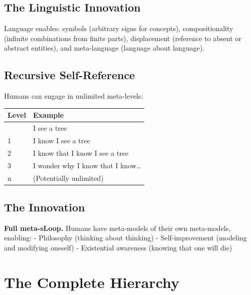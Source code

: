 \documentclass[
  11pt,
  letterpaper,
  twoside,
  openright]{book}
\begin{document}
\subsection{The Linguistic Innovation}\label{the-linguistic-innovation}

Language enables: symbols (arbitrary signs for concepts),
compositionality (infinite combinations from finite parts), displacement
(reference to absent or abstract entities), and meta-language (language
about language).

\subsection{Recursive Self-Reference}\label{recursive-self-reference}

Humans can engage in unlimited meta-levels:

\begin{longtable}[]{@{}ll@{}}
\toprule\noalign{}
Level & Example \\
\midrule\noalign{}
\endhead
\bottomrule\noalign{}
\endlastfoot
0 & I see a tree \\
1 & I know I see a tree \\
2 & I know that I know I see a tree \\
3 & I wonder why I know that I know\ldots{} \\
n & (Potentially unlimited) \\
\end{longtable}

\subsection{The Innovation}\label{the-innovation-7}

\textbf{Full meta-sLoop.} Humans have meta-models of their own
meta-models, enabling: - Philosophy (thinking about thinking) -
Self-improvement (modeling and modifying oneself) - Existential
awareness (knowing that one will die)

\section{The Complete Hierarchy}\label{the-complete-hierarchy}
\end{document}
